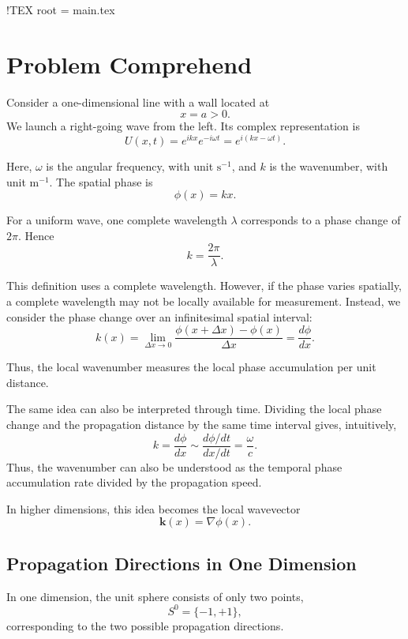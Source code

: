 !TEX root = main.tex




\section{Problem Comprehend}
Consider a one-dimensional line with a wall located at
\[
    x=a>0.
\]
We launch a right-going wave from the left. Its complex representation is
\[
    U(x,t)=e^{ikx}e^{-i\omega t}
    =e^{i(kx-\omega t)}.
\]

Here, $\omega$ is the angular frequency, with unit $\mathrm{s}^{-1}$,
and $k$ is the wavenumber, with unit $\mathrm{m}^{-1}$.
The spatial phase is
\[
    \phi(x)=kx.
\]

For a uniform wave, one complete wavelength $\lambda$ corresponds to
a phase change of $2\pi$. Hence
\[
    k=\frac{2\pi}{\lambda}.
\]

This definition uses a complete wavelength. However, if the phase varies
spatially, a complete wavelength may not be locally available for
measurement. Instead, we consider the phase change over an infinitesimal
spatial interval:
\[
    k(x)
    =\lim_{\Delta x\to0}
    \frac{\phi(x+\Delta x)-\phi(x)}{\Delta x}
    =\frac{d\phi}{dx}.
\]

Thus, the local wavenumber measures the local phase accumulation per
unit distance.

The same idea can also be interpreted through time.
Dividing the local phase change and the propagation distance
by the same time interval gives, intuitively,
\[
    k
    =\frac{d\phi}{dx}
    \sim
    \frac{d\phi/dt}{dx/dt}
    =\frac{\omega}{c}.
\]
Thus, the wavenumber can also be understood as the temporal phase
accumulation rate divided by the propagation speed.


In higher dimensions, this idea becomes the local wavevector
\[
    \mathbf{k}(x)=\nabla\phi(x).
\]


\subsection{Propagation Directions in One Dimension}
In one dimension, the unit sphere consists of only two points,
\[
    S^0=\{-1,+1\},
\]
corresponding to the two possible propagation directions.

